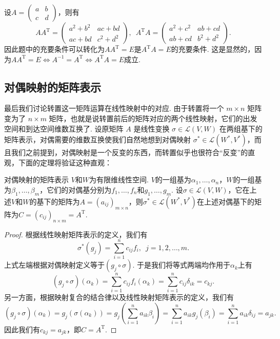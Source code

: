 \begin{solution}
    设$A=\begin{pmatrix}
            a & b \\ c & d
        \end{pmatrix}$，则有
    \[AA^\mathrm{T}=\begin{pmatrix}
            a^2+b^2 & ac+bd \\ ac+bd & c^2+d^2
        \end{pmatrix},\enspace A^\mathrm{T}A=\begin{pmatrix}
            a^2+c^2 & ab+cd \\ ab+cd & b^2+d^2
        \end{pmatrix}.\]
    因此题中的充要条件可以转化为$AA^\mathrm{T}=E$是$A^\mathrm{T}A=E$的充要条件. 这是显然的，因为$AA^\mathrm{T}=E\iff A^{-1}=A^\mathrm{T}\iff A^\mathrm{T}A=E$成立.
\end{solution}

\subsection{对偶映射的矩阵表示}

最后我们讨论转置这一矩阵运算在线性映射中的对应. 由于转置将一个 $m \times n$ 矩阵变为了 $n \times m$ 矩阵，也就是说转置前后的矩阵对应的两个线性映射，它们的出发空间和到达空间维数互换了. 设原矩阵 $A$ 是线性变换 $\sigma \in \mathcal{L}(V, W)$ 在两组基下的矩阵表示，对偶需要的维数互换使我们自然地想到对偶映射 $\sigma^* \in \mathcal{L}(W^*, V^*)$，而且我们之前提到，对偶映射是一个反变的东西，而转置似乎也很符合``反变''的直观，下面的定理将验证这种直观：

\begin{theorem}{}{对偶映射的矩阵表示}
    $V$和$W$为有限维线性空间. $V$的一组基为$\alpha_1,\ldots,\alpha_n$，$W$的一组基为$\beta_1,\ldots,\beta_m$，它们的对偶基分别为$f_1,\ldots,f_n$和$g_1,\ldots,g_m$. 设$\sigma\in\mathcal{L}(V,W)$，它在上述$V$和$W$的基下的矩阵为$A=(a_{ij})_{m \times n}$，则$\sigma^*\in\mathcal{L}(W^*,V^*)$在上述对偶基下的矩阵为$C=(c_{ij})_{n \times m}=A^\mathrm{T}$.
\end{theorem}

\begin{proof}
    根据线性映射矩阵表示的定义，我们有
    \[\sigma^*(g_j)=\sum_{i=1}^nc_{ij}f_i,\enspace j=1,2,\ldots,m.\]
    上式左端根据对偶映射定义等于$(g_j\circ\sigma)$. 于是我们将等式两端均作用于$\alpha_k$上有
    \[(g_j\circ\sigma)(\alpha_k)=\sum_{i=1}^nc_{ij}f_i(\alpha_k)=\sum_{i=1}^nc_{ij}\delta_{ik}=c_{kj}.\]
    另一方面，根据映射复合的结合律以及线性映射矩阵表示的定义，我们有
    \[(g_j\circ\sigma)(\alpha_k)=g_j(\sigma(\alpha_k))=g_j\left(\sum_{i=1}^na_{ik}\beta_i\right)=\sum_{i=1}^na_{ik}g_j(\beta_i)=\sum_{i=1}^na_{ik}\delta_{ij}=a_{jk}.\]
    因此我们有$c_{kj}=a_{jk}$，即$C=A^\mathrm{T}$.
\end{proof}

